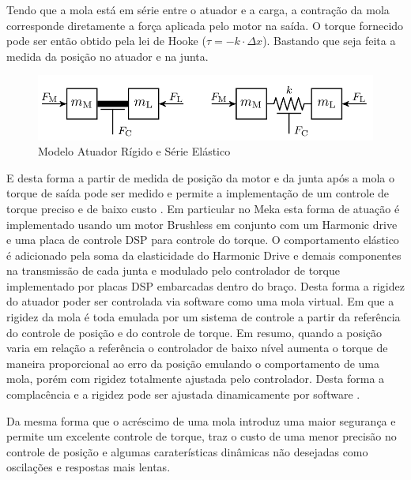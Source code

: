 Tendo que a mola está em série entre o atuador e a carga, a contração da mola corresponde diretamente a força aplicada pelo motor na saída. O torque fornecido pode ser então obtido pela lei de Hooke ($\tau = -k\cdot \Delta x$). Bastando que seja feita a medida da posição no atuador e na junta.

\begin{figure}[H]
    \centering
    \includegraphics[width=0.8\linewidth]{tex/figs/sea_ulrich.png}
    \caption{Modelo Atuador Rígido e Série Elástico \cite{Konigorski2012ModelSea}}
    \label{fig:sea}
\end{figure}

E desta forma a partir de medida de posição da motor e da junta após a mola o torque de saída pode ser medido e permite a implementação de um controle de torque preciso e de baixo custo \cite{pratt1997stiffness}. Em particular no Meka esta forma de atuação é implementado usando um motor Brushless em conjunto com um Harmonic drive e uma placa de controle DSP para controle do torque. O comportamento elástico é adicionado pela soma da elasticidade do Harmonic Drive e demais componentes na transmissão de cada junta e modulado pelo controlador de torque implementado por placas DSP embarcadas dentro do braço. Desta forma a rigidez do atuador poder ser controlada via software como uma mola virtual. Em que a rigidez da mola é toda emulada por um sistema de controle a partir da referência do controle de posição e do controle de torque. Em resumo, quando a posição varia em relação a referência o controlador de baixo nível aumenta o torque de maneira proporcional ao erro da posição emulando o comportamento de uma mola, porém com rigidez totalmente ajustada pelo controlador. Desta forma a complacência e a rigidez pode ser ajustada dinamicamente por software \cite{abeyrathna2013simulation}.

Da mesma forma que o acréscimo de uma mola introduz uma maior segurança e permite um excelente controle de torque, traz o custo de uma menor precisão no controle de posição e algumas caraterísticas dinâmicas não desejadas como oscilações e respostas mais lentas.



